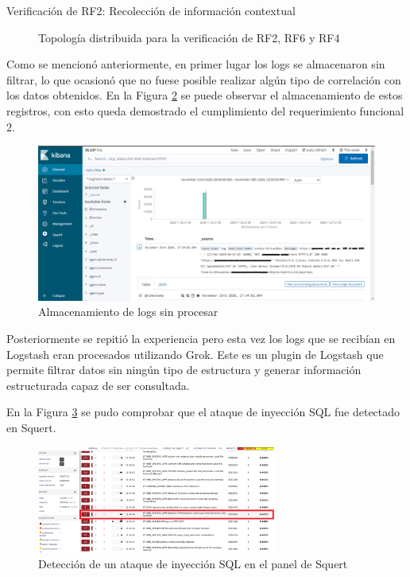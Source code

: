 \begin{section}{Verificación de RF2: Recolección de información contextual}
\begin{figure}[H]
    \caption{Topología distribuida para la verificación de RF2, RF6 y RF4}
    \label{fig:figura_iter2_ataque}
    \end{figure}
    \FloatBarrier
    Como se mencionó anteriormente, en primer lugar los logs se almacenaron sin filtrar, lo que ocasionó que no fuese posible realizar algún tipo de correlación con los datos obtenidos. En la Figura \ref{fig:iter2_logs_crudos} se puede observar el almacenamiento de estos registros, con esto queda demostrado el cumplimiento del requerimiento funcional 2.
    \begin{figure}[H]
    \centering
        \includegraphics[width=1\textwidth]{./iteracion_2_imagenes/1_kibana_logs_1EDITADA.png}
        \caption{Almacenamiento de logs sin procesar}
        \label{fig:iter2_logs_crudos}
    \end{figure}
    Posteriormente se repitió la experiencia pero esta vez los logs que se recibían en Logstash eran procesados utilizando Grok. Este es un plugin de Logstash que permite filtrar datos sin ningún tipo de estructura y generar información estructurada capaz de ser consultada. \par
    En la Figura \ref{fig:figura_squert-sql} se pudo comprobar que el ataque de inyección SQL fue detectado en Squert.
    \begin{figure}[H]
    \centering
        \includegraphics[width=0.7\textwidth]{./iteracion_2_imagenes/squert-sql-injection.png}
        \caption{Detección de un ataque de inyección SQL en el panel de Squert}
        \label{fig:figura_squert-sql}
    \end{figure}
    

\end{section}
